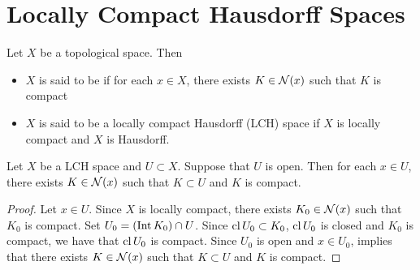 \documentclass{book}
\begin{document}
 
 
 
 
 
 
 
 
 
 
 
 
 
 
 
 
 
 
 
 
 
 
 
 
 
 
 
 
 
 
 
 
 
 
 
 
 
 
 
 
 
 
 	\newpage
 \section{Locally Compact Hausdorff Spaces}
 
 \begin{defn}
 	Let $X$ be a topological space. Then 
 	\begin{itemize}
 		\item $X$ is said to be  if for each $x \in X$, there exists $K \in \mathcal{N}(x)$ such that $K$ is compact
 		\item $X$ is said to be a locally compact Hausdorff (LCH) space if $X$ is locally compact and $X$ is Hausdorff. 
 	\end{itemize} 
 \end{defn}

\begin{ex}
	Let $X$ be a LCH space and $U \subset X$. Suppose that $U$ is open. Then for each $x \in U$, there exists $K \in \mathcal{N}(x)$ such that $K \subset U$ and $K$ is compact.
\end{ex}

\begin{proof}
	Let $x \in U$. Since $X$ is locally compact, there exists $K_0 \in \mathcal{N}(x)$ such that $K_0$ is compact. Set $U_0 = (\operatorname{Int} K_0) \cap U$. Since $\operatorname{cl} U_0 \subset K_0$, $\operatorname{cl} U_0$ is closed and $K_0$ is compact, we have that $\operatorname{cl} U_0$ is compact. Since $U_0$ is open and $x \in U_0$,  implies that there exists $K \in \mathcal{N}(x)$ such that $K \subset U$ and $K$ is compact.
\end{proof}
\end{document}
